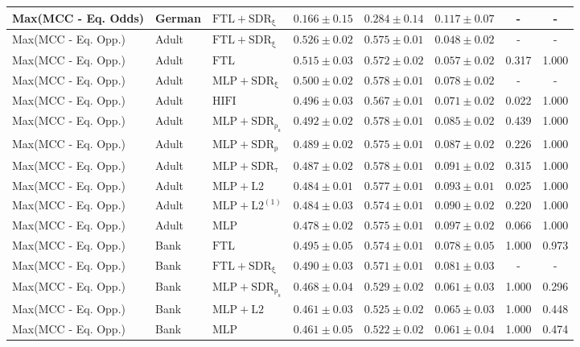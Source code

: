 \begin{table}[htbp]
\begin{tabular}{lllccccc}
Max(MCC - Eq. Odds) & German & $\mathrm{FTL+SDR_{\xi}}$ & $0.166 \pm0.15$ & $0.284 \pm0.14$ & $0.117 \pm0.07$ & - & - \\
\midrule
Max(MCC - Eq. Opp.) & Adult & $\mathrm{FTL+SDR_{\xi}}$ & $0.526 \pm0.02$ & $0.575 \pm0.01$ & $0.048 \pm0.02$ & - & - \\
Max(MCC - Eq. Opp.) & Adult & $\mathrm{FTL}$ & $0.515 \pm0.03$ & $0.572 \pm0.02$ & $0.057 \pm0.02$ & 0.317 & 1.000 \\
Max(MCC - Eq. Opp.) & Adult & $\mathrm{MLP+SDR_{\xi}}$ & $0.500 \pm0.02$ & $0.578 \pm0.01$ & $0.078 \pm0.02$ & - & - \\
Max(MCC - Eq. Opp.) & Adult & $\mathrm{HIFI}$ & $0.496 \pm0.03$ & $0.567 \pm0.01$ & $0.071 \pm0.02$ & 0.022 & 1.000 \\
Max(MCC - Eq. Opp.) & Adult & $\mathrm{MLP+SDR_{\rho_s}}$ & $0.492 \pm0.02$ & $0.578 \pm0.01$ & $0.085 \pm0.02$ & 0.439 & 1.000 \\
Max(MCC - Eq. Opp.) & Adult & $\mathrm{MLP+SDR_{\rho}}$ & $0.489 \pm0.02$ & $0.575 \pm0.01$ & $0.087 \pm0.02$ & 0.226 & 1.000 \\
Max(MCC - Eq. Opp.) & Adult & $\mathrm{MLP+SDR_{\tau}}$ & $0.487 \pm0.02$ & $0.578 \pm0.01$ & $0.091 \pm0.02$ & 0.315 & 1.000 \\
Max(MCC - Eq. Opp.) & Adult & $\mathrm{MLP+L2}$ & $0.484 \pm0.01$ & $0.577 \pm0.01$ & $0.093 \pm0.01$ & 0.025 & 1.000 \\
Max(MCC - Eq. Opp.) & Adult & $\mathrm{MLP+L2^{(1)}}$ & $0.484 \pm0.03$ & $0.574 \pm0.01$ & $0.090 \pm0.02$ & 0.220 & 1.000 \\
Max(MCC - Eq. Opp.) & Adult & $\mathrm{MLP}$ & $0.478 \pm0.02$ & $0.575 \pm0.01$ & $0.097 \pm0.02$ & 0.066 & 1.000 \\
Max(MCC - Eq. Opp.) & Bank & $\mathrm{FTL}$ & $0.495 \pm0.05$ & $0.574 \pm0.01$ & $0.078 \pm0.05$ & 1.000 & 0.973 \\
Max(MCC - Eq. Opp.) & Bank & $\mathrm{FTL+SDR_{\xi}}$ & $0.490 \pm0.03$ & $0.571 \pm0.01$ & $0.081 \pm0.03$ & - & - \\
Max(MCC - Eq. Opp.) & Bank & $\mathrm{MLP+SDR_{\rho_s}}$ & $0.468 \pm0.04$ & $0.529 \pm0.02$ & $0.061 \pm0.03$ & 1.000 & 0.296 \\
Max(MCC - Eq. Opp.) & Bank & $\mathrm{MLP+L2}$ & $0.461 \pm0.03$ & $0.525 \pm0.02$ & $0.065 \pm0.03$ & 1.000 & 0.448 \\
Max(MCC - Eq. Opp.) & Bank & $\mathrm{MLP}$ & $0.461 \pm0.05$ & $0.522 \pm0.02$ & $0.061 \pm0.04$ & 1.000 & 0.474 \\

\end{tabular}
\end{table}
